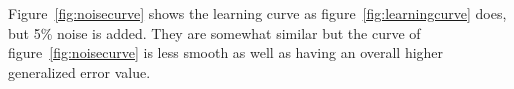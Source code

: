 Figure~\ref{fig:noisecurve} shows the learning curve as figure~\ref{fig:learningcurve} does, but 5\% noise is added.
They are somewhat similar but the curve of figure~\ref{fig:noisecurve} is less smooth as well as having an overall higher generalized error value.